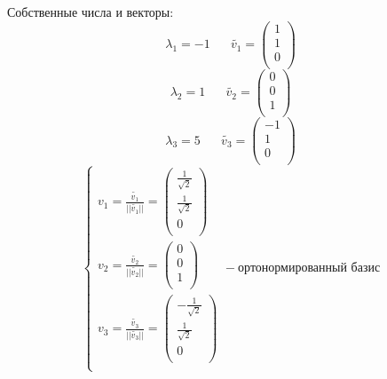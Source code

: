 \documentclass{article}
\begin{document}
    Собственные числа и векторы:
    \begin{equation*}
        \lambda_1 = -1 \; \; \; \; \; \; 
        \widetilde{v_1}=
        \begin{pmatrix}
            1\\
            1\\
            0\\
        \end{pmatrix}
    \end{equation*}
    \begin{equation*}
        \lambda_2 = 1 \; \; \; \; \; \; 
        \widetilde{v_2}=
        \begin{pmatrix}
            0\\
            0\\
            1\\
        \end{pmatrix}
    \end{equation*}
    \begin{equation*}
        \lambda_3 = 5 \; \; \; \; \; \; 
        \widetilde{v_3}=
        \begin{pmatrix}
            -1\\
            1\\
            0\\
        \end{pmatrix}
    \end{equation*}
    \begin{equation*}
        \begin{cases}
            v_1= \frac{\widetilde{v_1}}{\text{||} \widetilde{v_1} \text{||}} =
            \begin{pmatrix}
                \frac{1}{\sqrt{2}}\\
                \frac{1}{\sqrt{2}}\\
                0\\
            \end{pmatrix}\\
            v_2= \frac{\widetilde{v_2}}{\text{||} \widetilde{v_2} \text{||}} =
            \begin{pmatrix}
                0\\
                0\\
                1\\
            \end{pmatrix}\\
            v_3= \frac{\widetilde{v_3}}{\text{||} \widetilde{v_3} \text{||}} =
            \begin{pmatrix}
                -\frac{1}{\sqrt{2}}\\
                \frac{1}{\sqrt{2}}\\
                0\\
            \end{pmatrix}\\
        \end{cases} - \text{ортонормированный базис}
    \end{equation*}
\end{document}
